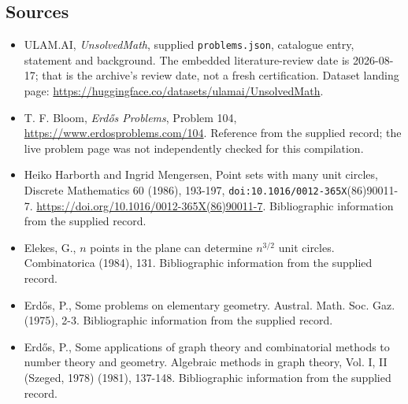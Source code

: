 \documentclass[11pt,a4paper]{article}
\begin{document}
\subsection{Sources}

{\small

\begin{itemize}

\item[\hypertarget{source:statement:1}{S1}] ULAM.AI, \emph{UnsolvedMath}, supplied \texttt{problems.json}, catalogue entry, statement and background. The embedded literature-review date is 2026-08-17; that is the archive’s review date, not a fresh certification. Dataset landing page: \url{https://huggingface.co/datasets/ulamai/UnsolvedMath}.

\item[\hypertarget{source:statement:2}{S2}] T. F. Bloom, \emph{Erdős Problems}, Problem 104, \url{https://www.erdosproblems.com/104}. Reference from the supplied record; the live problem page was not independently checked for this compilation.

\item[\hypertarget{source:statement:3}{S3}] Heiko Harborth and Ingrid Mengersen, Point sets with many unit circles, Discrete Mathematics 60 (1986), 193-197, \nolinkurl{doi:10.1016/0012-365X}(86)90011-7. \url{https://doi.org/10.1016/0012-365X(86)90011-7}. Bibliographic information from the supplied record.

\item[\hypertarget{source:statement:4}{S4}] Elekes, G., {$n$} points in the plane can determine $n^{3/2}$ unit circles. Combinatorica (1984), 131. Bibliographic information from the supplied record.

\item[\hypertarget{source:statement:5}{S5}] Erd\H{o}s, P., Some problems on elementary geometry. Austral. Math. Soc. Gaz. (1975), 2-3. Bibliographic information from the supplied record.

\item[\hypertarget{source:statement:6}{S6}] Erd\H{o}s, P., Some applications of graph theory and combinatorial methods to number theory and geometry. Algebraic methods in graph theory, Vol. I, II (Szeged, 1978) (1981), 137-148. Bibliographic information from the supplied record.

\end{itemize}

}

\label{end:statement}
\end{document}
